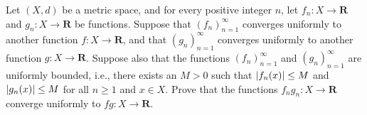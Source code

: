 \begin{exercise}\label{ex 3.3.8}
    Let \((X, d)\) be a metric space, and for every positive integer \(n\), let \(f_n : X \to \mathbf{R}\) and \(g_n : X \to \mathbf{R}\) be functions.
    Suppose that \((f_n)_{n = 1}^\infty\) converges uniformly to another function \(f : X \to \mathbf{R}\), and that \((g_n)_{n = 1}^\infty\) converges uniformly to another function \(g : X \to \mathbf{R}\).
    Suppose also that the functions \((f_n)_{n = 1}^\infty\) and \((g_n)_{n = 1}^\infty\) are uniformly bounded, i.e., there exists an \(M > 0\) such that \(\abs*{f_n(x)} \leq M\) and \(\abs*{g_n(x)} \leq M\) for all \(n \geq 1\) and \(x \in X\).
    Prove that the functions \(f_n g_n : X \to \mathbf{R}\) converge uniformly to \(fg : X \to \mathbf{R}\).
\end{exercise}

